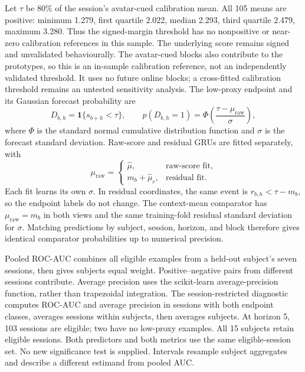 \documentclass[a4paper,10pt,onecolumn]{IEEEtran}
\begin{document}
Let $\tau$ be 80\% of the session's avatar-cued calibration mean.
All 105 means are positive: minimum 1.279, first quartile 2.022,
median 2.293, third quartile 2.479, maximum 3.280. Thus the signed-margin
threshold has no nonpositive or near-zero calibration references in this sample.
The underlying score remains signed and unvalidated behaviourally.
The avatar-cued blocks also contribute to the prototypes, so this is an
in-sample calibration reference, not an independently validated threshold.
It uses no future online blocks; a cross-fitted calibration threshold remains
an untested sensitivity analysis.
The low-proxy endpoint and its Gaussian forecast probability are
\begin{equation}
D_{b,h}=\mathbf{1}\{s_{b+h}<\tau\},\qquad
p(D_{b,h}=1)=\Phi\!\left(\frac{\tau-\mu_{\mathrm{raw}}}{\sigma}\right),
\end{equation}
where $\Phi$ is the standard normal cumulative distribution function
and $\sigma$ is the forecast standard deviation. Raw-score and residual
GRUs are fitted separately, with
\begin{equation}
\mu_{\mathrm{raw}}=
\begin{cases}
\hat\mu, & \text{raw-score fit},\\
m_b+\hat\mu_r, & \text{residual fit}.
\end{cases}
\end{equation}
Each fit learns its own $\sigma$. In residual coordinates, the same event
is $r_{b,h}<\tau-m_b$, so the endpoint labels do not change.
The context-mean comparator has $\mu_{\mathrm{raw}}=m_b$ in both views
and the same training-fold residual standard deviation for $\sigma$.
Matching predictions by subject, session, horizon, and block therefore
gives identical comparator probabilities up to numerical precision.

Pooled ROC-AUC combines all eligible examples from a held-out subject's seven
sessions, then gives subjects equal weight. Positive--negative pairs from
different sessions contribute. Average precision uses the scikit-learn
average-precision function, rather than trapezoidal integration.
The session-restricted diagnostic computes ROC-AUC and average precision
in sessions with both endpoint classes, averages sessions within subjects,
then averages subjects. At horizon 5, 103 sessions are eligible; two have
no low-proxy examples. All 15 subjects retain eligible sessions.
Both predictors and both metrics use the same eligible-session set.
No new significance test is supplied. Intervals resample subject aggregates
and describe a different estimand from pooled AUC.
\end{document}
